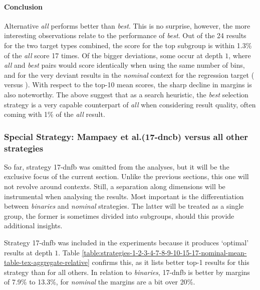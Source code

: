 \documentclass[smallextended]{svjour3}
\newcommand{\marvin}[1]{\textcolor{blue}{[#1]}}
\newcommand{\parameter}{\emph}
\newcommand{\binaries}{\parameter{binaries}}
\newcommand{\nominal}{\parameter{nominal}}
\newcommand{\all}{\parameter{all}}
\newcommand{\best}{\parameter{best}}
\newcommand{\dnca}[1]{\ifthenelse{\equal{#1}{0}}{7-dnca}{7-dnca\textsuperscript{#1}}}
\newcommand{\dncb}[1]{\ifthenelse{\equal{#1}{0}}{8-dncb}{8-dncb\textsuperscript{#1}}}
\newcommand{\dnfb}[1]{17-dnfb} %
\begin{document}
\paragraph{Conclusion}
Alternative \all{} performs better than \best{}.
This is no surprise, however, the more interesting observations relate to the performance of \best{}.
Out of the 24 results for the two target types combined, the score for the top subgroup is within 1.3\% of the \all{} score 17 times.
Of the bigger deviations, some occur at depth $1$, where \all{} and \best{} pairs would score identically when using the same number of bins, and for the very deviant results in the \nominal{} context for the regression target (\dnca{} versus \dncb{}).
With respect to the top-10 mean scores, the sharp decline in margins is also noteworthy.
The above suggest that as a search heuristic, the \best{} selection strategy is a very capable counterpart of \all{} when considering result quality, often coming with 1\% of the \all{} result.


\subsubsection{Special Strategy: Mampaey et al.\@ (17-dncb) versus all other strategies}
\label{section:special-strategy}

So far, strategy \dnfb{0} was omitted from the analyses, but it will be the exclusive focus of the current section.
Unlike the previous sections, this one will not revolve around contexts.
Still, a separation along dimensions will be instrumental when analysing the results.
Most important is the differentiation between \binaries{} and \nominal{} strategies.
The latter will be treated as a single group, the former is sometimes divided into subgroups, should this provide additional insights.

Strategy \dnfb{0} was included in the experiments because it produces `optimal' results at depth $1$.
Table \ref{table:strategies-1-2-3-4-7-8-9-10-15-17-nominal-mean-table-tex-aggregate-relative} confirms this, as it lists better top-1 results for this strategy than for all others.
In relation to \binaries{}, \dnfb{0} is better by margins of 7.9\% to 13.3\%, for \nominal{} the margins are a bit over 20\%.
\end{document}
